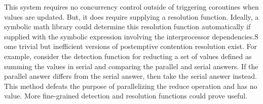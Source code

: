 \begin{comment}
$p$ performs its tasks that depend on $d_q$, it runs one of two coroutines.
Before $q$ updates the reference to the vector, it increments a counter. After
$q$ updates the reference, it does nothing. When $q$ finishes computing its
value for $d_q$, it must update the reference that $p$ uses so that $p$ can see
the update because the references act as if they were immutable. It also changes
the coroutine that $p$ runs when it computes a value that depends on $q$.
Finally, it looks at the value of the counter that $p$ kept for it. Knowing the
set of values in $G_p$ that depend on $d_q$ and the order that $p$ computes
them, it runs its resolution function $R_q$ on each value in $p$ that computed
before $q$ performed the computation they depended upon. Because $q$ knows how
its value integrates into the values of $p$ that depend on it, and because it
knows the values that $p$ actually used to perform the erroneous computations,
a concrete function $R_q$ exists can can be written or generated. Note that
in the general case where values in $G_p$ may have more dependencies on values
in $q$ or other processors, there's no guarantee that the value it resolves
corresponds to the final, correct value. Other resolutions might need to take
place before achieving that guarantee. In the worst case, $p$ completes all of
its computation before $q$ has done anything. Then, $q$ will essentially, by
resolving all values in $p$, perform the entire computation of values in $p$
dependent on $q$ in serial. In the best case, $q$ doesn't have to perform a
single resolution, achieving nearly maximal parallelism. To optimize this
process, $p$ should perform computations that are not dependent on $q$ while $q$
runs its resolution functions; otherwise, it risks generating more values in
need of resolution. Once all resolution has been performed on a particular
value, the reference containing the old version of that value can be freed from
memory, as it no longer serves a purpose.
\end{comment}

This system requires no concurrency control outside of triggering coroutines
when values are updated. But, it does require supplying a resolution function.
Ideally, a symbolic math library could determine this resolution function
automatically if supplied with the symbolic expression involving the
interprocessor dependencies.S ome trivial but inefficient versions of
postemptive contention resolution exist. For example, consider the detection
function for reducting a set of values defined as summing the values in serial
and comparing the parallel and serial answers. If the parallel answer differs
from the serial answer, then take the serial answer instead. This method defeats
the purpose of parallelizing the reduce operation and has no value. More
fine-grained detection and resolution functions could prove useful.

